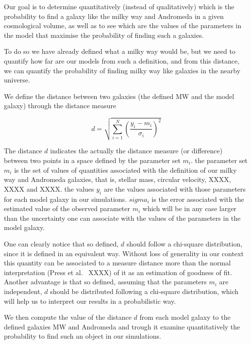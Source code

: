\documentclass[useAMS,usenatbib]{mn2e}
\newcommand{\etal}{et al.~}
\begin{document}
Our goal is to determine quantitatively (instead of qualitatively)
which is the probability to find a galaxy like the milky way and
Andromeda in a given cosmological volume, as well as to see which are
the values of the parameters in the model that maximise the
probability of finding such a galaxies.

To do so we have already defined what a milky way would be, but we
need to quantify how far are our models from such a definition, and
from this distance, we can quantify the probability of finding milky
way like galaxies in the nearby universe.

We define the distance between two galaxies (the defined MW and the
model galaxy) through the distance measure

\begin{equation}
  d = \sqrt{ \sum_{i=1}^N \left( \frac{y_i - m_i}{\sigma_i} \right)^2
  }
  \label{eq:distance}
\end{equation}

The distance $d$ indicates the actually the distance measure (or
difference) between two points in a space defined by the parameter set
$m_i$. the parameter set $m_i$ is the set of values of quantities
associated with the definition of our milky way and Andromeda
galaxies, that is, stellar mass, circular velocity, XXXX, XXXX and
XXXX. the values $y_i$ are the values associated with those parameters
for each model galaxy in our simulations. $sigma_i$ is the error
associated with the estimated value of the observed parameter $m_i$
which will be in any case larger than the uncertainty one can associate
with the values of the parameters in the model galaxy.

One can clearly notice that so defined, $d$ should follow a chi-square
distribution, since it is defined in an equivalent way. Without loss
of generality in our context this quantity can be associated to a
measure distance more than the normal interpretation (Press \etal
XXXX) of it as an estimation of goodness of fit. Another advantage is
that so defined, assuming that the parameters $m_i$ are independent,
$d$ should be distributed following a chi-square distribution, which
will help us to interpret our results in a probabilistic way.

We then compute the value of the distance $d$ from each model galaxy
to the defined galaxies MW and Andromeda and trough it examine
quantitatively the probability to find such an object in our
simulations.


\end{document}
